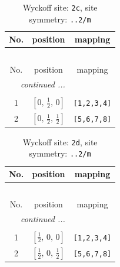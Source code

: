\documentclass[fleqn,8pt]{jsarticle}
\begin{document}
\renewcommand{\arraystretch}{1.2}
\begin{longtable}{ccc}
\caption{Wyckoff site: {\tt 2c}, site symmetry: {\tt ..2/m}}
 \\
 \hline \hline
No. & position & mapping \\ \hline \endfirsthead

\multicolumn{2}{l}{\tablename\ \thetable{}} \\
 \hline \hline
No. & position & mapping \\ \hline \endhead

 \hline \hline
\multicolumn{2}{r}{\footnotesize\it continued ...} \\ \endfoot

 \hline \hline
\multicolumn{2}{r}{} \\ \endlastfoot

1 & $\left[ 0,\, \frac{1}{2},\, 0 \right]$ & {\tt [1,2,3,4]} \\ \hline
2 & $\left[ 0,\, \frac{1}{2},\, \frac{1}{2} \right]$ & {\tt [5,6,7,8]} \\
\end{longtable}
\renewcommand{\arraystretch}{1.2}
\begin{longtable}{ccc}
\caption{Wyckoff site: {\tt 2d}, site symmetry: {\tt ..2/m}}
 \\
 \hline \hline
No. & position & mapping \\ \hline \endfirsthead

\multicolumn{2}{l}{\tablename\ \thetable{}} \\
 \hline \hline
No. & position & mapping \\ \hline \endhead

 \hline \hline
\multicolumn{2}{r}{\footnotesize\it continued ...} \\ \endfoot

 \hline \hline
\multicolumn{2}{r}{} \\ \endlastfoot

1 & $\left[ \frac{1}{2},\, 0,\, 0 \right]$ & {\tt [1,2,3,4]} \\ \hline
2 & $\left[ \frac{1}{2},\, 0,\, \frac{1}{2} \right]$ & {\tt [5,6,7,8]} \\
\end{longtable}
\renewcommand{\arraystretch}{1.2}
\end{document}
